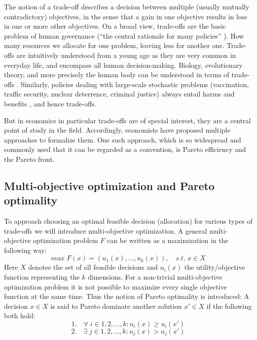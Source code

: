 

	The notion of a trade-off describes a decision between multiple (usually mutually contradictory) objectives, in the sense that a gain in one objective results in loss in one or more other objectives.
	On a broad view, trade-offs are the basic problem of human governance (``the central rationale for many policies'' \cite[p.~77]{Hardin1989}).
    How many resources we allocate for one problem, leaving less for another one.
	Trade-offs are intuitively understood from a young age as they are very common in everyday life, and encompass all human decision-making.
	Biology, evolutionary theory, and more precisely the human body can be understood in terms of trade-offs \cite{Launer2020}.
	Similarly, policies dealing with large-scale stochastic problems (vaccination, traffic security, nuclear deterrence, criminal justice) always entail harms and benefits \cite{Hardin1989}, and hence trade-offs.

	But in economics in particular trade-offs are of special interest, they are a central point of study in the field.
	Accordingly, economists have proposed multiple approaches to formalize them.
	One such approach, which is so widespread and commonly used that it can be regarded as a convention, is Pareto efficiency and the Pareto front.

	\subsection{Multi-objective optimization and Pareto optimality}

	To approach choosing an optimal feasible decision (allocation) for various types of trade-offs we will introduce multi-objective optimization.
	A general multi-objective optimization problem $F$ can be written as a maximization in the following way:
	$$max \; F(x)=(u_1(x),\dots,u_k(x)), \quad s.t.\; x\in X$$
	Here $X$ denotes the set of all feasible decisions and $u_i(x)$ the utility/objective function representing the $k$ dimensions.
	For a non-trivial multi-objective optimization problem it is not possible to maximize every single objective function at the same time.
	Thus the notion of Pareto optimality is introduced:
	A decision $x\in X$ is said to Pareto dominate another solution $x'\in X$ if the following both hold:
	$$1.\quad \forall\; i\in {1,2,\dots,k}: u_i(x)\ge u_i(x')$$
	$$2.\quad \exists\; j\in {1,2,\dots,k}: u_j(x) > u_j(x')$$

